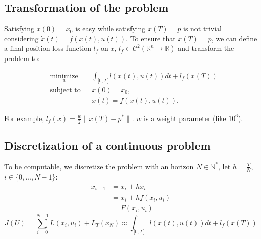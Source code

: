 \documentclass{report}
\begin{document}
%

\subsection{Transformation of the problem}

Satisfying $x(0) = x_0$ is easy while satisfying $x(T) = p$ is not trivial considering $\dot{x} (t) = f(x(t), u(t))$. To ensure that $x(T)= p$, we can define a final position loss function $l_f$ on $x$, $l_f \in \mathscr{C}^2(\mathbb{R}^n \to \mathbb{R})$ and transform the problem to: 

\begin{equation}
\begin{aligned}
& \underset{u}{\text{minimize}}
& & \int_{[0,T[} l(x(t),u(t)) dt + l_f(x(T)) \\
& \text{subject to}
& & x(0) = x_0,  \\
&&& \dot{x} (t) = f(x(t), u(t)).
\end{aligned}
\end{equation}
     
     For example, $l_f(x) = \frac{w}{2} \|x(T) - p^*\|$. $w$ is a weight parameter (like $10^6$).
     
     
\subsection{Discretization of a continuous problem}
To be computable, we discretize the problem with an horizon $N \in \mathbb{N}^*$, let $h=\frac{T}{N}$, $i\in \{0, ..., N-1\}$:
\begin{align*}
    x_{i+1} &= x_i + h \dot{x_i}  \\
            &= x_i + h f(x_i, u_i)  \\
            &= F(x_i, u_i)
\end{align*}
\begin{equation}
J(U) = \sum_{i = 0}^{N-1} L(x_i, u_i) + L_T(x_N) \approx \int_{[0,T[} l(x(t),u(t)) dt + l_f(x(T))
\end{equation}
\end{document}
